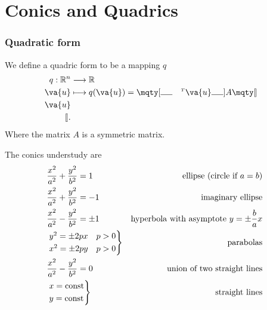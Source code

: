 \documentclass[a4paper,12pt]{article}
\begin{document}
\part{Conics and Quadrics}

\section{Quadratic form}
We define a quadric form to be a mapping $q$ 
\begin{align*}
    q: \mathbb{R}^n &\longrightarrow \mathbb{R} \\
    \va{u} &\longmapsto q(\va{u}) = \mqty[\rule{5mm}{0.4pt}&^{\mathsmaller T}\va{u}&\rule{5mm}{0.4pt}]A\mqty[\vline\\\va{u}\\\vline]
.\end{align*}
Where the matrix $A$ is a symmetric matrix.

The conics understudy are
\begin{align*}
    &\frac{x^2}{a^2}+\frac{y^2}{b^2}=1 \quad& \text{ellipse (circle if \(a=b\))}\\
    &\frac{x^2}{a^2}+\frac{y^2}{b^2}=-1& \text{imaginary ellipse}\\
    &\frac{x^2}{a^2}-\frac{y^2}{b^2}=\pm1&\text{hyperbola with asymptote }y=\pm\frac{b}{a}x\\
    &\begin{rcases}
        y^2=\pm 2px \quad p>0\\
        x^2=\pm 2py \quad p>0
    \end{rcases}& \text{parabolas}\\
    &\frac{x^2}{a^2}-\frac{y^2}{b^2}=0 &\text{union of two straight lines}\\
    &\begin{rcases}
        x=\text{const}\\
        y=\text{const}
    \end{rcases}&\text{straight lines}
\end{align*}
\end{document}
